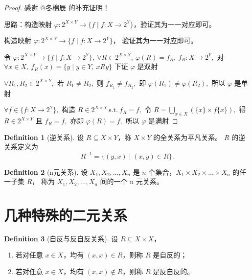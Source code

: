 \documentclass[oneside]{book}
\theoremstyle{definition}
\newtheorem{definition}{Definition}[section]
\begin{document}
		\begin{proof}
			感谢 @冬棉辰 的补充证明！
			
			思路：构造映射 \( \varphi: 2^{X \times Y} \to \{ f \mid f: X \to 2^Y \} \)，验证其为一一对应即可。
			
			构造映射
			\( \varphi : 2^{X \times Y} \to \{ f \mid f: X \to 2^Y \} \)，
			验证其为一一对应即可。
			
			\noindent
			令
			\( \varphi : 2^{X \times Y} \to \{ f \mid f: X \to 2^Y \},\ \forall R \in 2^{X \times Y},\ \varphi(R) =
			f_R,\ f_R : X \to 2^Y, \)
			对 \( \forall x \in X,\ f_R(x) = \{ y \mid y \in Y,\ xRy \} \)
			下证 \( \varphi \) 是双射
			
			\noindent
			\( \forall R_1, R_2 \in 2^{X \times Y}, \) 若 \( R_1 \neq R_2, \) 则 \( f_{R_1} \neq f_{R_2}, \) 即 \(
			\varphi(R_1) \neq \varphi(R_2), \)
			所以 \( \varphi \) 是单射
			
			\noindent
			\( \forall f \in \{ f: X \to 2^Y \}, \) 构造 \( R \in 2^{X \times Y}\ \text{s.t.}\ f_R = f, \) 令 \( R =
			\bigcup\limits_{x \in X} (\{x\} \times f\{x\}), \) 得 \( R \in 2^{X \times Y} \) 且 \( f_R = f, \) 亦即 \( \varphi(R)
			= f, \)
			所以 \( \varphi \) 是满射
		\end{proof}
			\begin{definition}[逆关系]
			设 \( R \subseteq X \times Y \)，称 \( X \times Y \) 的全关系为平凡关系。
			\( R \) 的逆关系定义为
			\[
			R^{-1} = \{ (y, x) \mid (x, y) \in R \}.
			\]
		\end{definition}
		
		\begin{definition}[n元关系]
			设 \( X_1, X_2, \dots, X_n \) 是 \( n \) 个集合，\( X_1 \times X_2 \times \dots \times X_n \) 的任一子集 \( R \)，
			称为 \( X_1, X_2, \dots, X_n \) 间的一个 n 元关系。
		\end{definition}
		
		\section{几种特殊的二元关系}
		
		\begin{definition}[自反与反自反关系]
			设 \( R \subseteq X \times X \)，
			\begin{enumerate}
				\item 若对任意 \( x \in X \)，均有 \( (x, x) \in R \)，则称 \( R \) 是自反的；
				\item 若对任意 \( x \in X \)，均有 \( (x, x) \notin R \)，则称 \( R \) 是反自反的。
			\end{enumerate}
		\end{definition}
		
\end{document}
